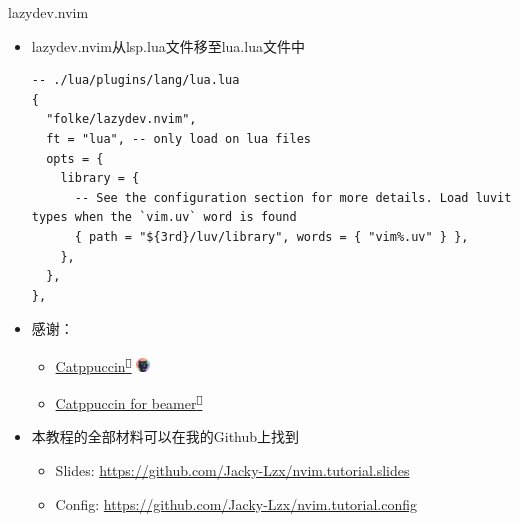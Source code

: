 \documentclass[aspectratio=169]{ctexbeamer}
\newcommand{\nerd}[1]{\texttt{#1}}
\newcommand{\link}[3][]{\href{#3}{#2\textsuperscript{\nerd{}}}}
\begin{document}
\begin{frame}[fragile]{lazydev.nvim}
  \begin{itemize}
    \item lazydev.nvim从lsp.lua文件移至lua.lua文件中
      \begin{lstlisting}[basicstyle=\tiny\ttfamily]
-- ./lua/plugins/lang/lua.lua
{
  "folke/lazydev.nvim",
  ft = "lua", -- only load on lua files
  opts = {
    library = {
      -- See the configuration section for more details. Load luvit types when the `vim.uv` word is found
      { path = "${3rd}/luv/library", words = { "vim%.uv" } },
    },
  },
},
      \end{lstlisting}
  \end{itemize}
\end{frame}

\begin{frame}
  \begin{itemize}
    \item 感谢：
      \begin{itemize}
        \item \link{Catppuccin}{https://catppuccin.com/} \includegraphics[height=10pt]{./Figures/Catppuccin_logo.png}
        \item \link{Catppuccin for beamer}{https://github.com/atticus-sullivan/beamercolortheme}
      \end{itemize}
      \vspace{0.5cm}
    \item 本教程的全部材料可以在我的Github上找到
      \begin{itemize}
        \item Slides: \url{https://github.com/Jacky-Lzx/nvim.tutorial.slides}
        \item Config: \url{https://github.com/Jacky-Lzx/nvim.tutorial.config}
      \end{itemize}
  \end{itemize}
\end{frame}
\end{document}
